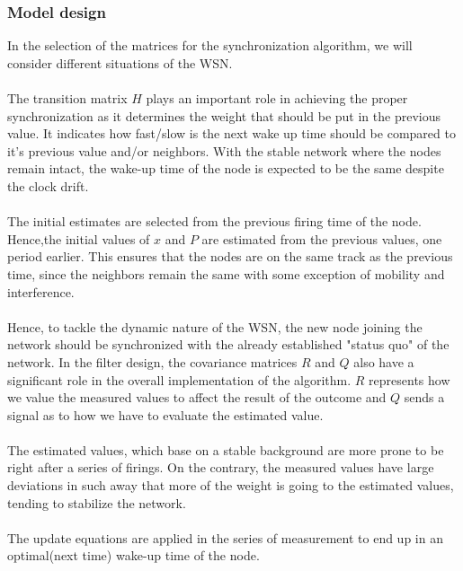 \documentclass[a4paper,10pt]{report}
\begin{document}
\subsubsection{Model design}
In the selection of the matrices for the synchronization algorithm, we will consider different situations of the WSN.
\paragraph*{}
The transition matrix $H$ plays an important role in achieving the proper synchronization as it determines the weight that should
be put in the previous value. It indicates how fast/slow is the next wake up time should be compared to it's previous value and/or neighbors. With the stable network where the nodes remain intact, the wake-up time of the node is expected to be the same despite the clock drift.
\paragraph*{}
The initial estimates are selected from the previous firing time of the node. Hence,the initial values of $x$ and $P$ are estimated from the previous values, one period earlier. This ensures that the nodes are on the same track as the previous time, since the neighbors remain the same with some exception of mobility and interference. \paragraph*{}
Hence, to tackle the dynamic nature of the WSN, the new node joining the network should be synchronized with the already established "status quo" of the network. In the filter design, the covariance matrices $R$ and $Q$ also have a significant role in the overall implementation of the algorithm. $R$ represents how we value the measured values to affect the result of the outcome and $Q$ sends a signal as to how we have to evaluate the estimated value. \paragraph*{} The estimated values, which base on a stable background are more prone to be right after a series of firings. On the contrary, the measured values have large deviations in such away that more of the weight is going to the estimated values, tending to stabilize the network. \paragraph*{} The update equations are applied in the series of measurement
to end up in an optimal(next time) wake-up time of the node.
\end{document}
